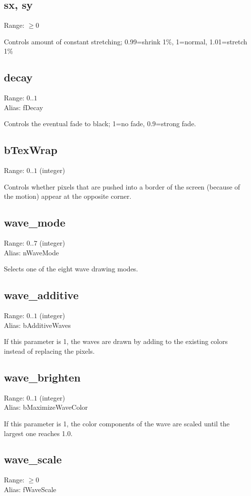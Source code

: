 \documentclass[11pt, a5paper, pagesize]{scrbook}
\begin{document}
\subsection{sx, sy}
Range: $\geq 0$

Controls amount of constant stretching; 0.99=shrink 1\%, 1=normal, 1.01=stretch 1\%  

\subsection{decay}
Range: $0..1$\\
Alias: fDecay

Controls the eventual fade to black; 1=no fade, 0.9=strong fade.

\subsection{bTexWrap}
Range: $0..1$ (integer)

Controls whether pixels that are pushed into a border of the screen (because of the motion) appear at the opposite corner.

\subsection{wave\_mode}
Range: $0..7$ (integer)\\
Alias: nWaveMode

Selects one of the eight wave drawing modes.

\subsection{wave\_additive}
Range: $0..1$ (integer)\\
Alias: bAdditiveWaves

If this parameter is 1, the waves are drawn by adding to the existing colors instead of replacing the pixels.

\subsection{wave\_brighten}
Range: $0..1$ (integer)\\
Alias: bMaximizeWaveColor

If this parameter is 1, the color components of the wave are scaled until the largest one reaches 1.0.

\subsection{wave\_scale}
Range: $\geq 0$\\
Alias: fWaveScale
\end{document}

